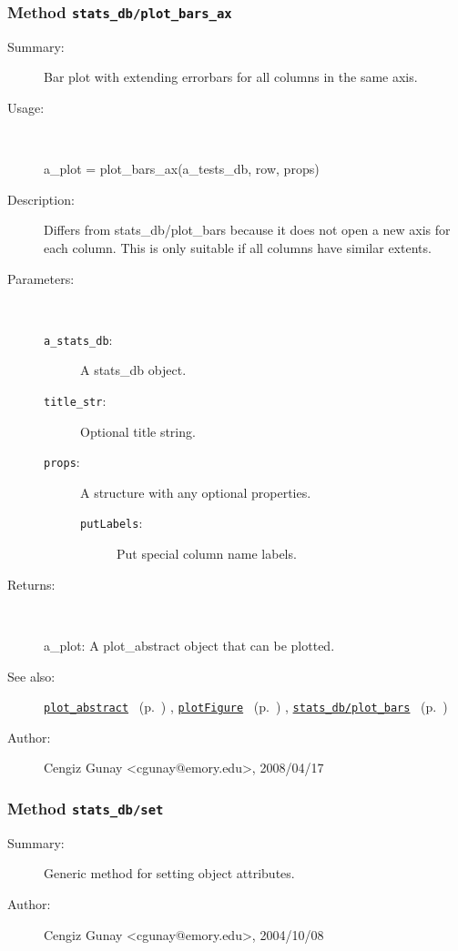 \subsubsection[Method \texttt{plot\_bars\_ax}]{Method \texttt{stats\_db/plot\_bars\_ax}}%
%
\label{ref_stats_db__plot_bars_ax}%
\hypertarget{ref_stats_db__plot_bars_ax}{}%
\begin{description}
\item[Summary:]Bar plot with extending errorbars for all columns in the same axis.
%
\item[Usage:]~%
\begin{lyxcode}%
a\_plot = plot\_bars\_ax(a\_tests\_db, row, props)
%
\end{lyxcode}%
%
\item[Description:]%
Differs from stats\_db/plot\_bars because it does not open a new axis
 for each column. This is only suitable if all columns have similar extents.
\item[Parameters:]~
\begin{description}%
\item[\texttt{a\_stats\_db}:]
 A stats\_db object.
\item[\texttt{title\_str}:]
 Optional title string.
\item[\texttt{props}:]
 A structure with any optional properties.
\begin{description}%
\item[\texttt{putLabels}:]
 Put special column name labels.
\end{description}%
\end{description}%
%
\item[Returns:
]~

	a\_plot: A plot\_abstract object that can be plotted.
%
%
\item[See also:]%
\hyperlink{ref_plot_abstract}{\texttt{plot\_abstract}}%
\ (p.~\pageref{ref_plot_abstract})%
%
, \hyperlink{ref_plotFigure}{\texttt{plotFigure}}%
\ (p.~\pageref{ref_plotFigure})%
%
, \hyperlink{ref_stats_db__plot_bars}{\texttt{stats\_db/plot\_bars}}%
\ (p.~\pageref{ref_stats_db__plot_bars})%
%
%
\item[Author:]%
Cengiz Gunay <cgunay@emory.edu>, 2008/04/17
%
\end{description}
\methodline%
\subsubsection[Method \texttt{set}]{Method \texttt{stats\_db/set}}%
%
\label{ref_stats_db__set}%
\hypertarget{ref_stats_db__set}{}%
\begin{description}
\item[Summary:]Generic method for setting object attributes.
%
%
%
%
%
%
%
\item[Author:]%
Cengiz Gunay <cgunay@emory.edu>, 2004/10/08
%
\end{description}
\methodline%
